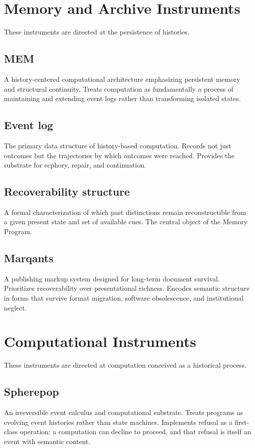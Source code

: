\documentclass[12pt, openany]{book}
\begin{document}
\section{Memory and Archive Instruments}

These instruments are directed at the persistence of histories.

\subsection{MEM} A history-centered computational architecture
emphasizing persistent memory and structural continuity. Treats computation
as fundamentally a process of maintaining and extending event logs rather
than transforming isolated states.

\subsection{Event log} The primary data structure of history-based
computation. Records not just outcomes but the trajectories by which
outcomes were reached. Provides the substrate for ecphory, repair, and
continuation.

\subsection{Recoverability structure} A formal characterization of which
past distinctions remain reconstructible from a given present state and set
of available cues. The central object of the Memory Program.

\subsection{Marqants} A publishing markup system designed for long-term
document survival. Prioritizes recoverability over presentational richness.
Encodes semantic structure in forms that survive format migration, software
obsolescence, and institutional neglect.

\section{Computational Instruments}

These instruments are directed at computation conceived as a historical
process.

\subsection{Spherepop} An irreversible event calculus and computational
substrate. Treats programs as evolving event histories rather than state
machines. Implements refusal as a first-class operation: a computation can
decline to proceed, and that refusal is itself an event with semantic content.
\end{document}
